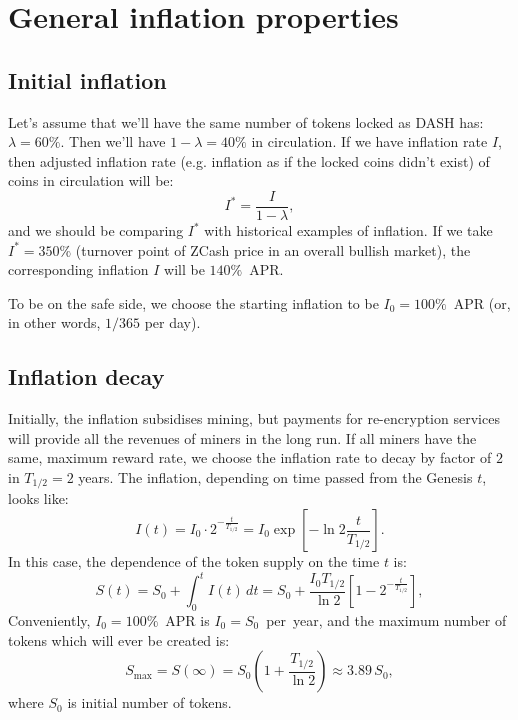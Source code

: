 \documentclass[longbibliography,nofootinbib,twocolumn]{revtex4-1}
\begin{document}
\section{General inflation properties}

\subsection{Initial inflation}

Let's assume that we'll have the same number of tokens locked as DASH has: $\lambda=60\%$.
Then we'll have $1-\lambda=40\%$ in circulation.
If we have inflation rate $I$, then adjusted inflation rate (e.g. inflation as if the locked coins didn't exist) of coins in circulation will be:
\begin{equation}
    I^* = \frac{I}{1-\lambda},
\end{equation}
and we should be comparing $I^*$ with historical examples of inflation.
If we take $I^*=350\%$ (turnover point of ZCash price in an overall bullish market), the corresponding inflation $I$ will be $140\%$~APR.

To be on the safe side, we choose the starting inflation to be $I_0=100\%$~APR (or, in other words, $1/365$ per day).

\subsection{Inflation decay}

Initially, the inflation subsidises mining, but payments for re-encryption services will provide all the revenues of miners in the long run.
If all miners have the same, maximum reward rate, we choose the inflation rate to decay by factor of $2$ in $T_{1/2} = 2$ years.
The inflation, depending on time passed from the Genesis $t$, looks like:
\begin{equation}
    I(t) = I_0 \cdot 2^{-\frac{t}{T_{1/2}}} = I_0 \exp\left[ -\ln{2} \frac{t}{T_{1/2}} \right].
\end{equation}
In this case, the dependence of the token supply on the time $t$ is:
\begin{equation}
    \label{eq:supply-time}
    S(t) = S_0 + \int_0^{t} I(t)\, dt = S_0 + \frac{I_0 T_{1/2}}{\ln{2}}\left[1 - 2^{-\frac{t}{T_{1/2}}} \right],
\end{equation}
Conveniently, $I_0=100\%$~APR is $I_0=S_0$~per~year, and the maximum number of tokens which will ever be created is:
\begin{equation}
    S_{\max} = S(\infty) = S_0\left(1 + \frac{T_{1/2}}{\ln{2}}\right) \approx 3.89\, S_0,
\end{equation}
where $S_0$ is initial number of tokens.
\end{document}
